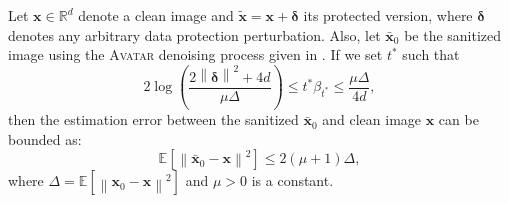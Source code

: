 \documentclass[conference]{IEEEtran}
\theoremstyle{definition}
\theoremstyle{remark}
\theoremstyle{proposition}
\newenvironment{customthm}[1]
{\renewcommand\theinnercustomthm{#1}\innercustomthm}
{\endinnercustomthm}
\newcommand{\norm}[1]{\left\lVert#1\right\rVert}
\begin{document}
\begin{customthm}{1}[restated]\label{thm:convergence:rep}
    Let $\boldsymbol{x} \in \mathbb{R}^{d}$ denote a clean image and $\tilde{\boldsymbol{x}} = \boldsymbol{x} + \boldsymbol{\delta}$ its protected version, where ${\boldsymbol{\delta}}$ denotes any arbitrary data protection perturbation.
    Also, let $\bar{\boldsymbol{x}}_{0}$ be the sanitized image using the \textsc{Avatar} denoising process given in .
    If we set $t^{*}$ such that
    $$2\log\left(\frac{2\norm{\boldsymbol{\delta}}^{2} + 4d}{\mu \Delta}\right) \leq t^{*} \beta_{t^{*}} \leq \frac{\mu \Delta}{4d},$$
    then the estimation error between the sanitized $\bar{\boldsymbol{x}}_{0}$ and clean image $\boldsymbol{x}$ can be bounded as:
    $$\mathbb{E}\left[\norm{\bar{\boldsymbol{x}}_{0} - \boldsymbol{x}}^2\right] \leq 2(\mu + 1)\Delta,$$
    where $\Delta = \mathbb{E}[\norm{\boldsymbol{x}_0 - \boldsymbol{x}}^{2}]$ and $\mu > 0$ is a constant.
\end{customthm}
\end{document}
